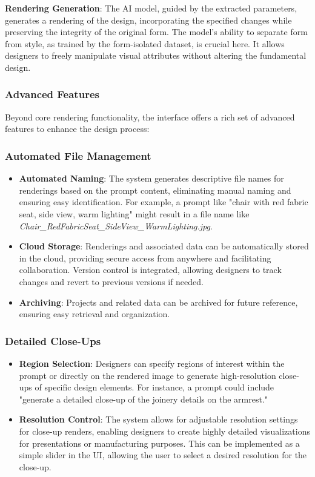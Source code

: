 \documentclass{article}
\begin{document}
\textbf{Rendering Generation}: The AI model, guided by the extracted parameters, generates a rendering of the design, incorporating the specified changes while preserving the integrity of the original form. The model's ability to separate form from style, as trained by the form-isolated dataset, is crucial here. It allows designers to freely manipulate visual attributes without altering the fundamental design.

\subsubsection{Advanced Features}

Beyond core rendering functionality, the interface offers a rich set of advanced features to enhance the design process:

\subsubsection{Automated File Management}
\begin{itemize}
\item \textbf{Automated Naming}: The system generates descriptive file names for renderings based on the prompt content, eliminating manual naming and ensuring easy identification. For example, a prompt like "chair with red fabric seat, side view, warm lighting" might result in a file name like \textit{Chair\_RedFabricSeat\_SideView\_WarmLighting.jpg}.
\item \textbf{Cloud Storage}: Renderings and associated data can be automatically stored in the cloud, providing secure access from anywhere and facilitating collaboration. Version control is integrated, allowing designers to track changes and revert to previous versions if needed.
\item \textbf{Archiving}: Projects and related data can be archived for future reference, ensuring easy retrieval and organization.
\end{itemize}

\subsubsection{Detailed Close-Ups}
\begin{itemize}
\item \textbf{Region Selection}: Designers can specify regions of interest within the prompt or directly on the rendered image to generate high-resolution close-ups of specific design elements. For instance, a prompt could include "generate a detailed close-up of the joinery details on the armrest."
\item \textbf{Resolution Control}: The system allows for adjustable resolution settings for close-up renders, enabling designers to create highly detailed visualizations for presentations or manufacturing purposes. This can be implemented as a simple slider in the UI, allowing the user to select a desired resolution for the close-up.
\end{itemize}
\end{document}

